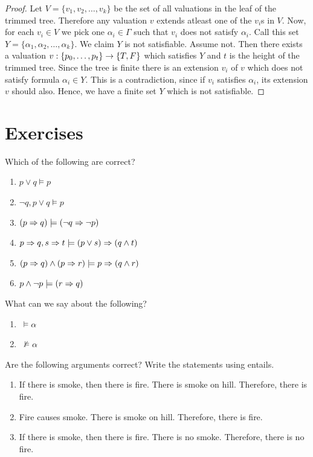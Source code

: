 \begin{proof}
Let $V = \{v_1,v_2,\dots,v_k\}$ be the set of all valuations in the leaf of the trimmed tree. Therefore any valuation $v$ extends atleast one of the $v_i$s in $V$. Now, for each $v_i \in V$ we pick one $\alpha _i\in \Gamma$ such that $v_i$ does not satisfy $\alpha_i$. Call this set $Y=\{\alpha_1,\alpha_2,\dots,\alpha_k\}$. We claim $Y$ is not satisfiable. Assume not. Then there exists a valuation $v:\{p_0,\dots,p_t\} \rightarrow \{T,F\}$ which satisfies $Y$ and $t$ is the height of the trimmed tree. Since the tree is finite there is an extension $v_i$ of $v$ which does not satisfy formula $\alpha_i \in Y$. This is a contradiction, since if $v_i$ satisfies $\alpha_i$, its extension $v$ should also. Hence, we have a finite set $Y$ which is not satisfiable.
\end{proof}

\section{Exercises}
\begin{exercise}
Which of the following are correct?
\begin{multicols}{2}
\begin{enumerate}
\item $p \vee q \models p$
\item $\neg q, p \vee q \models p$
\item $(p \Rightarrow q) \models (\neg q \Rightarrow \neg p)$
\item $p \Rightarrow q, s \Rightarrow t \models (p \vee s) \Rightarrow (q \wedge t)$
\item $(p \Rightarrow q) \wedge (p \Rightarrow r) \models p \Rightarrow (q \wedge r)$
\item $p \wedge \neg p \models (r \Rightarrow q)$
\end{enumerate}
\end{multicols}
\end{exercise}

\begin{exercise}
What can we say about the following?
\begin{multicols}{2}
\begin{enumerate}
\item \true $~ \models \alpha$
\item \true $~ \not \models \alpha$
\end{enumerate}
\end{multicols}
\end{exercise}


\begin{exercise}[Nyayasutra]
Are the following arguments correct? Write the statements using entails.
\begin{enumerate}
\item If there is smoke, then there is fire. There is smoke on hill. Therefore, there is fire. 
\item Fire causes smoke. There is smoke on hill. Therefore, there is fire.
\item If there is smoke, then there is fire. There is no smoke. Therefore, there is no fire.
\end{enumerate}
\end{exercise}

